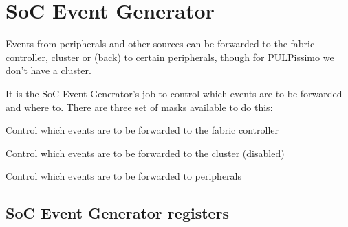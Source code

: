 \section{SoC Event Generator}

\pulpissimo Events from peripherals and other sources can be forwarded to the
fabric controller, cluster or (back) to certain peripherals, though for
PULPissimo we don't have a cluster.

It is the SoC Event Generator's job to control which events are to be forwarded and where to.
There are three set of masks available to do this:
\begin{enumerate}[leftmargin=\widthof{[Peripheral Masks]}+\labelsep]
  \item[FC Masks] Control which events are to be forwarded to the fabric controller
  \item[Cluster Masks] Control which events are to be forwarded to the cluster (disabled)
  \item[Peripheral Masks] Control which events are to be forwarded to peripherals
\end{enumerate}



\subsection{SoC Event Generator registers}

